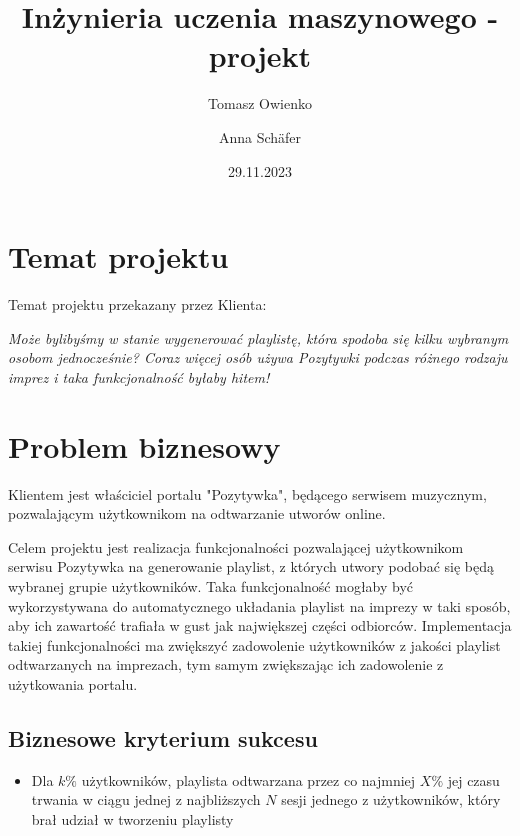 \documentclass[10pt,a4paper]{article}
\title{Inżynieria uczenia maszynowego - projekt}
\author{Tomasz Owienko \and Anna Schäfer}
\date{29.11.2023}
\begin{document}
\maketitle

\section{Temat projektu}




Temat projektu przekazany przez Klienta:

\begin{displayquote}
	\textit{Może bylibyśmy w stanie wygenerować playlistę, która spodoba się kilku wybranym osobom jednocześnie? Coraz więcej osób używa Pozytywki podczas różnego rodzaju imprez i taka funkcjonalność byłaby hitem!}
\end{displayquote}


\section{Problem biznesowy}

Klientem jest właściciel portalu "Pozytywka", będącego serwisem muzycznym, pozwalającym użytkownikom na odtwarzanie utworów online.

Celem projektu jest realizacja funkcjonalności pozwalającej użytkownikom serwisu Pozytywka na generowanie playlist, z których utwory podobać się będą wybranej grupie użytkowników. Taka funkcjonalność mogłaby być wykorzystywana do automatycznego układania playlist na imprezy w taki sposób, aby ich zawartość trafiała w gust jak największej części odbiorców. Implementacja takiej funkcjonalności ma zwiększyć zadowolenie użytkowników z jakości playlist odtwarzanych na imprezach, tym samym zwiększając ich zadowolenie z użytkowania portalu.

\subsection*{Biznesowe kryterium sukcesu}
\begin{itemize}
\item Dla $k\%$ użytkowników, playlista odtwarzana przez co najmniej $X\%$ jej czasu trwania w ciągu jednej z najbliższych $N$ sesji jednego z użytkowników, który brał udział w tworzeniu playlisty 
\end{itemize}
\end{document}
